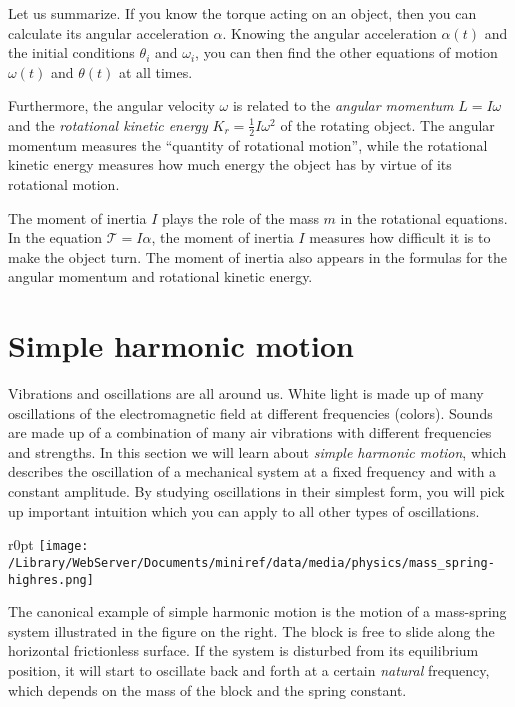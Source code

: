\documentclass[letterpaper,9pt,journal]{IEEEtran}
\newcommand{\dokuitalic}[1]{\textsl{#1}}
\begin{document}
Let us summarize. If you know the torque acting on an object, 
then you can calculate its angular acceleration $\alpha$. 
Knowing the angular acceleration $\alpha(t)$ and the initial conditions $\theta_i$ and $\omega_i$,
you can then find the other equations of motion $\omega(t)$ and $\theta(t)$ at all times.

Furthermore, the angular velocity $\omega$ is related to the \dokuitalic{angular momentum}
$L=I\omega$ and the \dokuitalic{rotational kinetic energy} $K_r=\frac{1}{2}I \omega^2$ of 
the rotating object. The angular momentum measures the ``quantity of rotational motion'',
while the rotational kinetic energy measures how much energy the object has by virtue of 
its rotational motion. 

The moment of inertia $I$ plays the role of the mass $m$ in the rotational equations.
In the equation $\mathcal{T}=I\alpha$, the moment of inertia $I$ measures how
difficult it is to make the object turn.
The moment of inertia also appears in the formulas for the angular momentum and 
rotational kinetic energy.


\section{Simple harmonic motion}
\label{cd80db888044ca76c4e83c74b55b1b83}%

Vibrations and oscillations are all around us. 
White light is made up of many oscillations of the electromagnetic field at different frequencies (colors).
Sounds are made up of a combination of many air vibrations with different frequencies and strengths.
In this section we will learn about \dokuitalic{simple harmonic motion}, 
which describes the oscillation of a mechanical system at a fixed frequency and with a constant amplitude.
By studying oscillations in their simplest form, you will pick up important
intuition which you can apply to all other types of oscillations.


\begin{wrapfigure}{r}{0pt}
\texttt{[image: /Library/WebServer/Documents/miniref/data/media/physics/mass\_spring-highres.png]}
\end{wrapfigure}

The canonical example of simple harmonic motion is the motion of a mass-spring system
illustrated in the figure on the right. The block is free to slide along
the horizontal frictionless surface. If the system is disturbed from its
equilibrium position, it will start to oscillate back and forth at 
a certain \dokuitalic{natural} frequency, which depends on the mass of the block and the spring constant.
\end{document}
